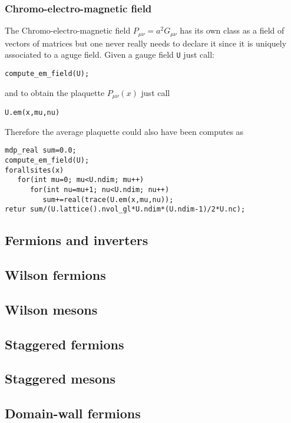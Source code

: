 \subsubsection{Chromo-electro-magnetic field}

The Chromo-electro-magnetic field $P_{\mu \nu }=a^2G_{\mu \nu }$ has its own
class as a field of vectors of matrices but one never really needs to
declare it since it is uniquely associated to a aguge field. Given a gauge
field {\tt U} just call:
\begin{verbatim}
compute_em_field(U);
\end{verbatim}

and to obtain the plaquette $P_{\mu \nu }(x)$ just call
\begin{verbatim}
U.em(x,mu,nu)
\end{verbatim}

Therefore the average plaquette could also have been computes as
\begin{verbatim}
mdp_real sum=0.0;
compute_em_field(U);
forallsites(x) 
   for(int mu=0; mu<U.ndim; mu++)
      for(int nu=mu+1; nu<U.ndim; nu++)
         sum+=real(trace(U.em(x,mu,nu));
retur sum/(U.lattice().nvol_gl*U.ndim*(U.ndim-1)/2*U.nc);
\end{verbatim}

\subsection{Fermions and inverters}

\subsection{Wilson fermions}

\subsection{Wilson mesons}

\subsection{Staggered fermions}

\subsection{Staggered mesons}

\subsection{Domain-wall fermions}

